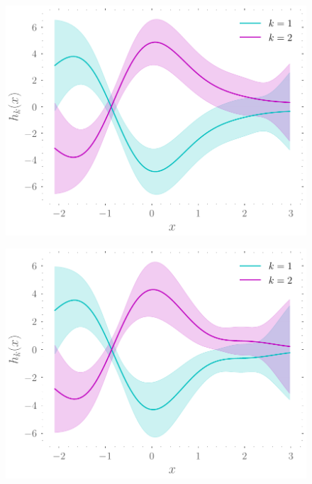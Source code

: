 \documentclass{mimosis-class/mimosis}
\numberwithin{equation}{chapter}
\newcommand{\modeInd}{\ensuremath{k}}
\newcommand{\ModeInd}{\ensuremath{\MakeUppercase{\modeInd}}}
\begin{document}
{\begin{figure}[hbt!]
\begin{minipage}[r]{0.49\textwidth}
\label{fig-expert-gps-mcycle-two-experts-further}
\end{minipage}
\begin{minipage}[r]{0.49\textwidth}
\centering
\includegraphics[width=\textwidth]{./images/model/mcycle/K=2_L2/gating_gps.pdf}
\label{fig-gating-gps-mcycle-two-experts-tight}
\end{minipage}
\begin{minipage}[r]{0.49\textwidth}
\centering
\includegraphics[width=\textwidth]{./images/model/mcycle/K=2_L3/gating_gps.pdf}

\end{minipage}
\end{figure}}
\end{document}

